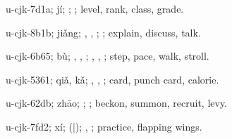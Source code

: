 \begin{multicols}{2}
{\cjkgGlue{}u-cjk-7d1a; jí; \cjkgGlue{}; \cjkgGlue{}; level, rank, class, grade.

\cjkgGlue{}u-cjk-8b1b; jiǎng; \cjkgGlue{}, \cjkgGlue{}, \cjkgGlue{}; \cjkgGlue{}; explain, discuss, talk.

\cjkgGlue{}u-cjk-6b65; bù; \cjkgGlue{}, \cjkgGlue{}, \cjkgGlue{}; \cjkgGlue{}, \cjkgGlue{}, \cjkgGlue{}; step, pace, walk, stroll.

\cjkgGlue{}u-cjk-5361; qiǎ, kǎ; \cjkgGlue{}, \cjkgGlue{}, \cjkgGlue{}; card, punch card, calorie.

\cjkgGlue{}u-cjk-62db; zhāo; \cjkgGlue{}\cjkgGlue{}\cjkgGlue{}; \cjkgGlue{}; beckon, summon, recruit, levy.

\cjkgGlue{}u-cjk-7fd2; xí; \cjkgGlue{}\cjkgGlue{}(\cjkgGlue{}|\cjkgGlue{}); \cjkgGlue{}, \cjkgGlue{}; practice, flapping wings.

}
\end{multicols}
